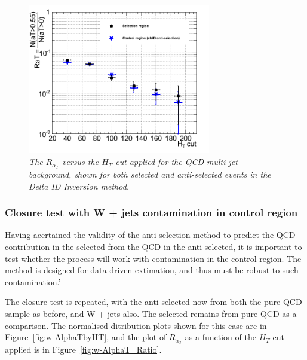 \begin{figure}[h!]
\begin{center}
\includegraphics[width=80mm]{Plots/mc-alphaTratio}
\end{center}
\caption{\textit{The $R_{\alpha_T}$ versus the $H_{T}$ cut applied for the QCD multi-jet background, shown for both selected and anti-selected events in the Delta ID Inversion method.}}
\label{fig:AlphaT_Ratio}
\end{figure}

\subsubsection {Closure test with W + jets contamination in control region}

Having acertained the validity of the anti-selection method to predict the QCD contribution in the selected from the QCD in the anti-selected, it is important to test whether the process will work with contamination in the control region. The method is designed for data-driven extimation, and thus must be robust to such contamination.'

The closure test is repeated, with the anti-selected now from both the pure QCD sample as before, and W + jets also. The selected remains from pure QCD as a comparison. The normalised ditribution plots shown for this case are in Figure~\ref{fig:w-AlphaTbyHT}, and the plot of $R_{\alpha_T}$ as a function of the $H_{T}$ cut applied is in Figure~\ref{fig:w-AlphaT_Ratio}. 

